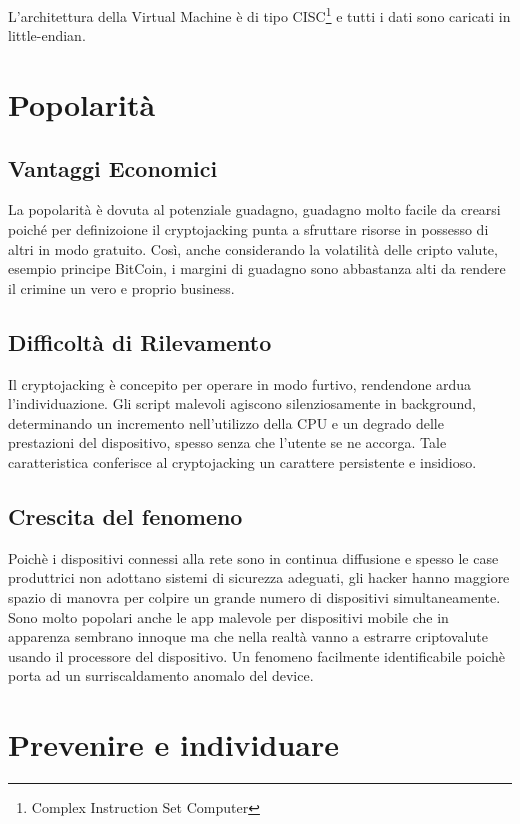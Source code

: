 \documentclass[12pt,a4paper]{article}
\begin{document}
L'architettura della Virtual Machine è di tipo CISC\footnote{Complex Instruction
Set Computer} e tutti i dati sono caricati in little-endian. 

\newpage 

\section{Popolarità}

\subsection{Vantaggi Economici}
La popolarità è dovuta al potenziale guadagno, guadagno molto facile da crearsi
poiché per definizoione il cryptojacking punta a sfruttare risorse in possesso
di altri in modo gratuito. Così, anche considerando la volatilità delle cripto
valute, esempio principe BitCoin, i margini di guadagno sono abbastanza alti da
rendere il crimine un vero e proprio business. 

\subsection{Difficoltà di Rilevamento}
Il cryptojacking è concepito per operare in modo furtivo, rendendone ardua
l'individuazione. Gli script malevoli agiscono silenziosamente in background,
determinando un incremento nell'utilizzo della CPU e un degrado delle
prestazioni del dispositivo, spesso senza che l'utente se ne accorga. Tale
caratteristica conferisce al cryptojacking un carattere persistente e insidioso.

\subsection{Crescita del fenomeno}
Poichè i dispositivi connessi alla rete sono in continua diffusione e spesso le
case produttrici non adottano sistemi di sicurezza adeguati, gli hacker hanno
maggiore spazio di manovra per colpire un grande numero di dispositivi
simultaneamente. Sono molto popolari anche le app malevole per dispositivi
mobile che in apparenza sembrano innoque ma che nella realtà vanno a estrarre
criptovalute usando il processore del dispositivo. Un fenomeno facilmente
identificabile poichè porta ad un surriscaldamento anomalo del device.

\newpage

\section{Prevenire e individuare}
\end{document}
